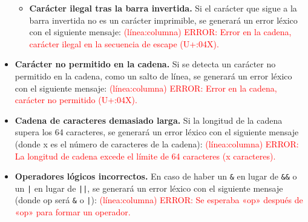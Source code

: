 \begin{itemize}[left=1cm]
\begin{itemize}
        \item \textbf{Carácter ilegal tras la barra invertida.} Si el carácter que sigue a la barra invertida no es un carácter imprimible, se generará un error léxico con el siguiente mensaje: \textcolor{red}{(línea:columna) ERROR: Error en la cadena, carácter ilegal en la secuencia de escape (U+{:04X}).}
    \end{itemize}
    \item \textbf{Carácter no permitido en la cadena.} Si se detecta un carácter no permitido en la cadena, como un salto de línea, se generará un error léxico con el siguiente mensaje: \textcolor{red}{(línea:columna) ERROR: Error en la cadena, carácter no permitido (U+{:04X}).}
    \item \textbf{Cadena de caracteres demasiado larga.} Si la longitud de la cadena supera los 64 caracteres, se generará un error léxico con el siguiente mensaje (donde x es el número de caracteres de la cadena): \textcolor{red}{(línea:columna) ERROR: La longitud de cadena excede el límite de 64 caracteres (x caracteres).}
	\item \textbf{Operadores lógicos incorrectos.} En caso de haber un \verb!&! en lugar de \verb!&&! o un \verb!|! en lugar de \verb!||!, se generará un error léxico con el siguiente mensaje (donde op será \verb!&! o \verb!|!): \textcolor{red}{(línea:columna) ERROR: Se esperaba «op» después de «op» para formar un operador.}
\end{itemize}
